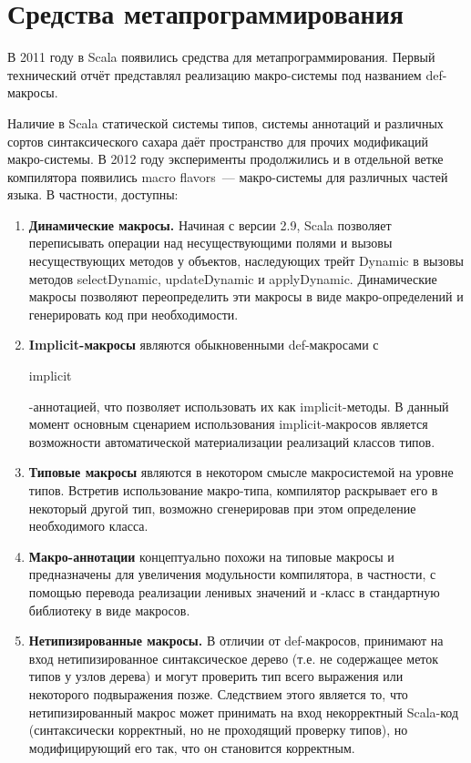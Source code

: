 \section{Средства метапрограммирования}
В 2011 году в Scala появились средства для метапрограммирования. Первый технический отчёт\cite{Burmako2012} представлял реализацию макро-системы под названием \<def\>-макросы. 

Наличие в Scala статической системы типов, системы аннотаций и различных сортов синтаксического сахара даёт пространство для прочих модификаций макро-системы. В 2012 году эксперименты продолжились и в отдельной ветке компилятора появились macro flavors\cite{Burmako2013}~--- макро-системы для различных частей языка. В частности, доступны:
\begin{enumerate}
  \item \textbf{Динамические макросы.} Начиная с версии 2.9, Scala позволяет переписывать операции над несуществующими полями и вызовы несуществующих методов у объектов, наследующих трейт \<Dynamic\> в вызовы методов \<selectDynamic\>, \<updateDynamic\> и \<applyDynamic\>. Динамические макросы позволяют переопределить эти макросы в виде макро-определений и генерировать код при необходимости.
  \item \textbf{Implicit-макросы} являются обыкновенными \<def\>-макросами с \begin{otherlanguage}{english}implicit\end{otherlanguage}-аннотацией, что позволяет использовать их как implicit-методы. В данный момент основным сценарием использования implicit-макро\-сов является возможности автоматической материализации реализаций классов типов.
  \item \textbf{Типовые макросы} являются в некотором смысле макросистемой на уровне типов. Встретив использование макро-типа, компилятор раскрывает его в некоторый другой тип, возможно сгенерировав при этом определение необходимого класса.
  \item \textbf{Макро-аннотации} концептуально похожи на типовые макросы и предназначены для увеличения модульности компилятора, в частности, с помощью перевода реализации ленивых значений и \<\>-класс в стандартную библиотеку в виде макросов.
  \item \textbf{Нетипизированные макросы.} В отличии от \<def\>-макросов, принимают на вход нетипизированное синтаксическое дерево (т.е. не содержащее меток типов у узлов дерева) и могут проверить тип всего выражения или некоторого подвыражения позже. Следствием этого является то, что нетипизированный макрос может принимать на вход некорректный Scala-код (синтаксически корректный, но не проходящий проверку типов), но модифицирующий его так, что он становится корректным.
\end{enumerate}

